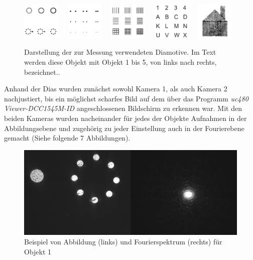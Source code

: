 \begin{figure}
	\centering
	\includegraphics[width=0.16\textwidth]{images/Anleitungsheft/objekt1.png}~~
	\includegraphics[width=0.16\textwidth]{images/Anleitungsheft/objekt2.png}~~
	\includegraphics[width=0.16\textwidth]{images/Anleitungsheft/objekt3.png}~~
	\includegraphics[width=0.16\textwidth]{images/Anleitungsheft/objekt4.png}~~
	\includegraphics[width=0.16\textwidth]{images/Anleitungsheft/objekt5.png}
	\caption[Die zur Messung verwendeten Diamotive]{
		Darstellung der zur Messung verwendeten Diamotive. Im Text werden diese Objekt mit Objekt 1 bis 5, von links nach rechts, bezeichnet..
	}
\label{fig:Objekte-aus-Anleitungsheft}
\end{figure}

Anhand der Dias wurden zunächst sowohl Kamera 1, als auch Kamera 2 nachjustiert, bis ein möglichst scharfes Bild auf dem über das Programm \textit{uc480 Viewer-DCC1545M-ID} angeschlossenen Bildschirm zu erkennen war. Mit den beiden Kameras wurden nacheinander für jedes der Objekte Aufnahmen in der Abbildungsebene und zugehörig zu jeder Einstellung auch in der Fourierebene gemacht (Siehe folgende 7 Abbildungen). 

\begin{figure}
\centering
\includegraphics[width=0.7\linewidth]{images/example1.png}
\caption{Beispiel von Abbildung (links) und Fourierspektrum (rechts) für Objekt 1}
\label{fig:example1}
\end{figure}

